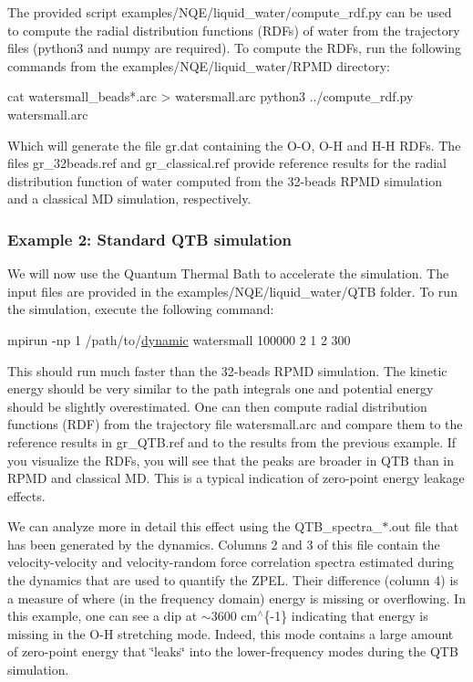 The provided script {\ttfamily examples/\-N\-Q\-E/liquid\-\_\-water/compute\-\_\-rdf.\-py} can be used to compute the radial distribution functions (R\-D\-Fs) of water from the trajectory files (python3 and numpy are required). To compute the R\-D\-Fs, run the following commands from the {\ttfamily examples/\-N\-Q\-E/liquid\-\_\-water/\-R\-P\-M\-D} directory\-:


\begin{DoxyCode}
cat watersmall\_beads*.arc > watersmall.arc
python3 ../compute\_rdf.py watersmall.arc
\end{DoxyCode}


Which will generate the file {\ttfamily gr.\-dat} containing the O-\/\-O, O-\/\-H and H-\/\-H R\-D\-Fs. The files {\ttfamily gr\-\_\-32beads.\-ref} and {\ttfamily gr\-\_\-classical.\-ref} provide reference results for the radial distribution function of water computed from the 32-\/beads R\-P\-M\-D simulation and a classical M\-D simulation, respectively.

\subsubsection*{Example 2\-: Standard Q\-T\-B simulation}

We will now use the Quantum Thermal Bath to accelerate the simulation. The input files are provided in the {\ttfamily examples/\-N\-Q\-E/liquid\-\_\-water/\-Q\-T\-B} folder. To run the simulation, execute the following command\-:


\begin{DoxyCode}
mpirun -np 1 /path/to/\hyperlink{dynamic_8f90_a242c646ad028ae81e8a4bed2193eae5d}{dynamic} watersmall 100000 2 1 2 300
\end{DoxyCode}


This should run much faster than the 32-\/beads R\-P\-M\-D simulation. The kinetic energy should be very similar to the path integrals one and potential energy should be slightly overestimated. One can then compute radial distribution functions (R\-D\-F) from the trajectory file {\ttfamily watersmall.\-arc} and compare them to the reference results in {\ttfamily gr\-\_\-\-Q\-T\-B.\-ref} and to the results from the previous example. If you visualize the R\-D\-Fs, you will see that the peaks are broader in Q\-T\-B than in R\-P\-M\-D and classical M\-D. This is a typical indication of zero-\/point energy leakage effects.

We can analyze more in detail this effect using the {\ttfamily Q\-T\-B\-\_\-spectra\-\_\-$\ast$.out} file that has been generated by the dynamics. Columns 2 and 3 of this file contain the velocity-\/velocity and velocity-\/random force correlation spectra estimated during the dynamics that are used to quantify the Z\-P\-E\-L. Their difference (column 4) is a measure of where (in the frequency domain) energy is missing or overflowing. In this example, one can see a dip at $\sim$3600 cm$^\wedge$\{-\/1\} indicating that energy is missing in the O-\/\-H stretching mode. Indeed, this mode contains a large amount of zero-\/point energy that \char`\"{}leaks\char`\"{} into the lower-\/frequency modes during the Q\-T\-B simulation.

